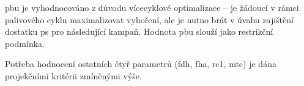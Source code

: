 \ac{pbu} je vyhodnocováno z důvodu vícecyklové optimalizace -- je žádoucí v rámci palivového cyklu maximalizovat vyhoření, ale je nutno brát 
v úvahu zajištění dostatku \ac{ps} pro následující kampaň. Hodnota \ac{pbu} slouží jako restrikční podmínka. 

Potřeba hodnocení ostatních čtyř parametrů (\ac{fdh}, \ac{fha}, \ac{rc1}, \ac{mtc}) je dána projekčními kritérii zmíněnými výše.


% 
